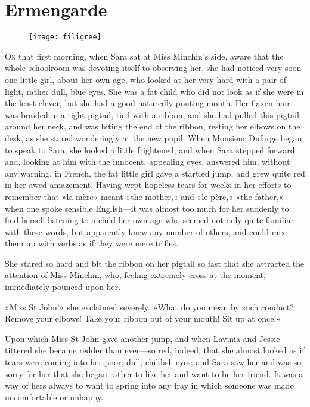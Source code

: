 \chapter{Ermengarde}

\begin{figure}[t!]
\centering
\texttt{[image: filigree]}
\end{figure}

\lettrine[lines=5]{O}{n} that first morning, when Sara sat at Miss Minchin's side, aware that the whole schoolroom was devoting itself to observing her, she had noticed very soon one little girl, about her own age, who looked at her very hard with a pair of light, rather dull, blue eyes. She was a fat child who did not look as if she were in the least clever, but she had a good-naturedly pouting mouth. Her flaxen hair was braided in a tight pigtail, tied with a ribbon, and she had pulled this pigtail around her neck, and was biting the end of the ribbon, resting her elbows on the desk, as she stared wonderingly at the new pupil. When Monsieur Dufarge began to speak to Sara, she looked a little frightened; and when Sara stepped forward and, looking at him with the innocent, appealing eyes, answered him, without any warning, in French, the fat little girl gave a startled jump, and grew quite red in her awed amazement. Having wept hopeless tears for weeks in her efforts to remember that »la mère« meant »the mother,« and »le père,« »the father,«—when one spoke sensible English—it was almost too much for her suddenly to find herself listening to a child her own age who seemed not only quite familiar with these words, but apparently knew any number of others, and could mix them up with verbs as if they were mere trifles.

She stared so hard and bit the ribbon on her pigtail so fast that she attracted the attention of Miss Minchin, who, feeling extremely cross at the moment, immediately pounced upon her.

»Miss St John!« she exclaimed severely. »What do you mean by such conduct? Remove your elbows! Take your ribbon out of your mouth! Sit up at once!«

Upon which Miss St John gave another jump, and when Lavinia and Jessie tittered she became redder than ever—so red, indeed, that she almost looked as if tears were coming into her poor, dull, childish eyes; and Sara saw her and was so sorry for her that she began rather to like her and want to be her friend. It was a way of hers always to want to spring into any fray in which someone was made uncomfortable or unhappy.

